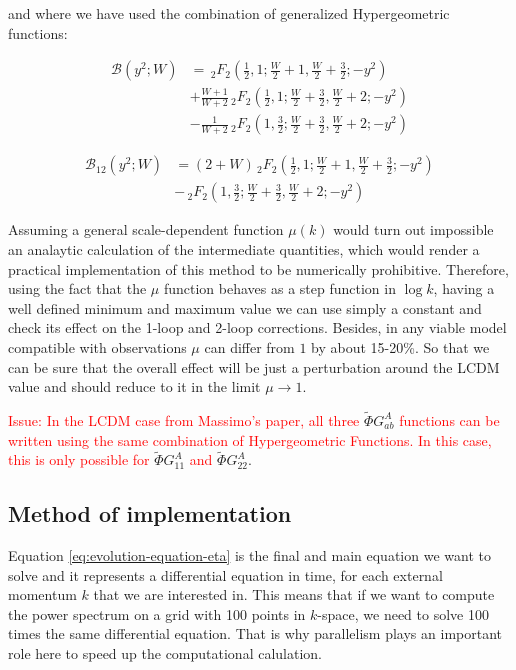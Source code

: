 and where we have used the combination of generalized Hypergeometric
functions:

\begin{align*}
\mathcal{B}(y^{2};W) & =\,_{2}F_{2}\left(\frac{1}{2},1;\frac{W}{2}+1,\frac{W}{2}+\frac{3}{2};-y^{2}\right)\\
 & +\frac{W+1}{W+2}\,_{2}F_{2}\left(\frac{1}{2},1;\frac{W}{2}+\frac{3}{2},\frac{W}{2}+2;-y^{2}\right)\\
 & -\frac{1}{W+2}\,_{2}F_{2}\left(1,\frac{3}{2};\frac{W}{2}+\frac{3}{2},\frac{W}{2}+2;-y^{2}\right)
\end{align*}


\begin{align*}
\mathcal{B}_{12}(y^{2};W) & =(2+W)\,_{2}F_{2}\left(\frac{1}{2},1;\frac{W}{2}+1,\frac{W}{2}+\frac{3}{2};-y^{2}\right)\\
 & -\,_{2}F_{2}\left(1,\frac{3}{2};\frac{W}{2}+\frac{3}{2},\frac{W}{2}+2;-y^{2}\right)
\end{align*}


Assuming a general scale-dependent function $\mu(k)$ would turn out
impossible an analaytic calculation of the intermediate quantities,
which would render a practical implementation of this method to be
numerically prohibitive. Therefore, using the fact that the $\mu$
function behaves as a step function in $\log k$, having a well defined
minimum and maximum value we can use simply a constant and check its
effect on the 1-loop and 2-loop corrections. Besides, in any viable
model compatible with observations $\mu$ can differ from $1$ by
about 15-20\%. So that we can be sure that the overall effect will
be just a perturbation around the LCDM value and should reduce to
it in the limit $\mu\rightarrow1$.

\textcolor{red}{Issue: }\textcolor{red}{In the LCDM case from
Massimo's paper, all three }$\tilde{\Phi}G_{ab}^{A}$ \textcolor{red}{functions
can be written using the same combination of Hypergeometric Functions.
In this case, this is only possible for }$\tilde{\Phi}G_{11}^{A}$
\textcolor{red}{and} $\tilde{\Phi}G_{22}^{A}$.


\subsection{Method of implementation}

Equation \ref{eq:evolution-equation-eta} is the final and main equation
we want to solve and it represents a differential equation in time,
for each external momentum $k$ that we are interested in. This means
that if we want to compute the power spectrum on a grid with 100 points
in $k$-space, we need to solve 100 times the same differential equation.
That is why parallelism plays an important role here to speed up the
computational calulation.

